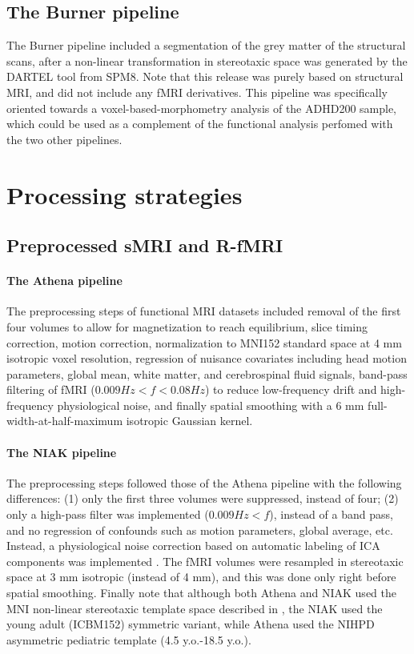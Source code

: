 \documentclass[preprint,12pt,1p]{elsarticle}
\begin{document}
\subsection{The Burner pipeline}

The Burner pipeline included a segmentation of the grey matter of the structural scans, after a non-linear transformation in stereotaxic space was generated by the DARTEL tool from SPM8. Note that this release was purely based on structural MRI, and did not include any fMRI derivatives. This pipeline was specifically oriented towards a voxel-based-morphometry analysis of the ADHD200 sample, which could be used as a complement of the functional analysis perfomed with the two other pipelines. 


\section{Processing strategies}

\subsection{Preprocessed sMRI and R-fMRI}
\paragraph{The Athena pipeline} The preprocessing steps of functional MRI datasets included removal of the first four volumes to allow for magnetization to reach equilibrium, slice timing correction, motion correction, normalization to MNI152 standard space at 4 mm isotropic voxel resolution, regression of nuisance covariates including head motion parameters, global mean, white matter, and cerebrospinal ﬂuid signals, band-pass filtering of fMRI ($0.009 Hz < f < 0.08 Hz$) to reduce low-frequency drift and high-frequency physiological noise, and finally spatial smoothing with a 6 mm full-width-at-half-maximum isotropic Gaussian kernel. 

\paragraph{The NIAK pipeline} The preprocessing steps followed those of the Athena pipeline with the following differences: (1) only the first three volumes were suppressed, instead of four; (2) only a high-pass filter was implemented ($0.009 Hz < f$), instead of a band pass, and no regression of confounds such as motion parameters, global average, etc. Instead, a physiological noise correction based on automatic labeling of ICA components was implemented \citep{Perlbarg2007}. The fMRI volumes were resampled in stereotaxic space at 3 mm isotropic (instead of 4 mm), and this was done only right before spatial smoothing. Finally note that although both Athena and NIAK used the MNI non-linear stereotaxic template space described in \citep{Fonov2011}, the NIAK used the young adult (ICBM152) symmetric variant, while Athena used the NIHPD asymmetric pediatric template (4.5 y.o.-18.5 y.o.).  
\end{document}
